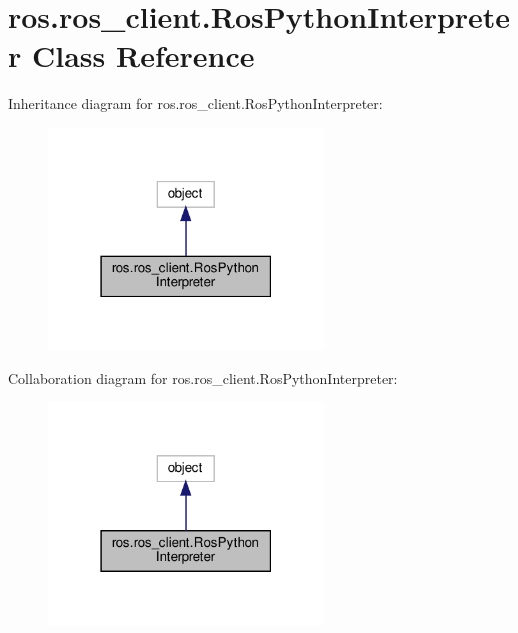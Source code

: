 \hypertarget{classros_1_1ros__client_1_1RosPythonInterpreter}{}\section{ros.\+ros\+\_\+client.\+Ros\+Python\+Interpreter Class Reference}
\label{classros_1_1ros__client_1_1RosPythonInterpreter}


Inheritance diagram for ros.\+ros\+\_\+client.\+Ros\+Python\+Interpreter\+:
\nopagebreak
\begin{figure}[H]
\begin{center}
\leavevmode
\includegraphics[width=207pt]{classros_1_1ros__client_1_1RosPythonInterpreter__inherit__graph}
\end{center}
\end{figure}


Collaboration diagram for ros.\+ros\+\_\+client.\+Ros\+Python\+Interpreter\+:
\nopagebreak
\begin{figure}[H]
\begin{center}
\leavevmode
\includegraphics[width=207pt]{classros_1_1ros__client_1_1RosPythonInterpreter__coll__graph}
\end{center}
\end{figure}
